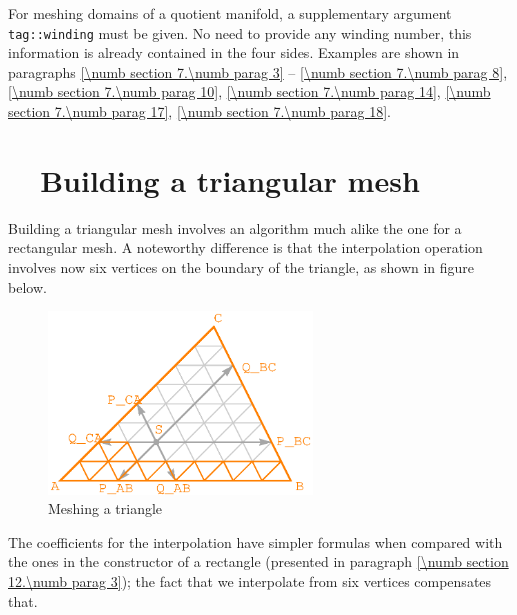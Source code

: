 For meshing domains of a quotient manifold, a supplementary argument
{\small\tt\textcolor{tag}{tag}::winding} must be given.
No need to provide any winding number, this information is already contained in the four sides.
Examples are shown in paragraphs \ref{\numb section 7.\numb parag 3} --
\ref{\numb section 7.\numb parag 8}, \ref{\numb section 7.\numb parag 10},
\ref{\numb section 7.\numb parag 14}, \ref{\numb section 7.\numb parag 17},
\ref{\numb section 7.\numb parag 18}.


\section{~~Building a triangular mesh}\label{\numb section 12.\numb parag 4}

Building a triangular mesh involves an algorithm much alike the one for a rectangular mesh.
A noteworthy difference is that the interpolation operation involves now six vertices on
the boundary of the triangle, as shown in figure below.

\begin{figure}[ht] \centering
  \includegraphics[width=70mm]{fig-triangle}
  \caption{Meshing a triangle}
  \label{\numb section 12.\numb fig 2}
\end{figure}

The coefficients for the interpolation have simpler formulas when compared with the ones in the
constructor of a rectangle (presented in paragraph \ref{\numb section 12.\numb parag 3});
the fact that we interpolate from six vertices compensates that.

